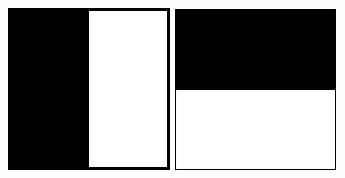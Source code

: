 \documentclass[xcolor=dvipsnames]{beamer}
\begin{document}
\begin{frame}
 \begin{center}
 \includegraphics[width=.3\textwidth]{imgs/haar-x.jpg}
 \includegraphics[width=.3\textwidth]{imgs/haar-y.jpg}
 \end{center}
\end{frame}
\end{document}
